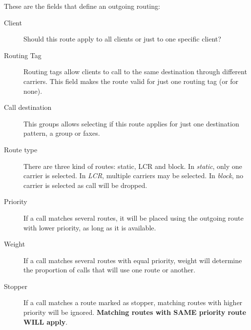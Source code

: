 \documentclass[letterpaper,10pt,spanish]{sphinxmanual}
\begin{document}
These are the fields that define an outgoing routing:
\begin{description}
\item[{Client}] \leavevmode{}\label{administration_portal/brand/routing/outgoing_routings:term-client}
Should this route apply to all clients or just to one specific client?

\item[{Routing Tag}] \leavevmode{}\label{administration_portal/brand/routing/outgoing_routings:term-routing-tag}
Routing tags allow clients to call to the same destination through different carriers. This field makes the
route valid for just one routing tag (or for none).

\item[{Call destination}] \leavevmode{}\label{administration_portal/brand/routing/outgoing_routings:term-call-destination}
This groups allows selecting if this route applies for just one destination pattern, a group or faxes.

\item[{Route type}] \leavevmode{}\label{administration_portal/brand/routing/outgoing_routings:term-route-type}
There are three kind of routes: static, LCR and block. In \emph{static}, only one carrier is selected. In \emph{LCR}, multiple carriers
may be selected. In \emph{block}, no carrier is selected as call will be dropped.

\item[{Priority}] \leavevmode{}\label{administration_portal/brand/routing/outgoing_routings:term-priority}
If a call matches several routes, it will be placed using the outgoing
route with lower priority, as long as it is available.

\item[{Weight}] \leavevmode{}\label{administration_portal/brand/routing/outgoing_routings:term-weight}
If a call matches several routes with equal priority, weight will determine
the proportion of calls that will use one route or another.

\item[{Stopper}] \leavevmode{}\label{administration_portal/brand/routing/outgoing_routings:term-stopper}
If a call matches a route marked as stopper, matching routes with higher priority
will be ignored. \textbf{Matching routes with SAME priority route WILL apply}.

\end{description}
\end{document}
